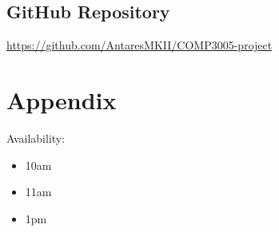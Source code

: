 \documentclass[fleqn]{scrreprt}
\begin{document}
\section{GitHub Repository}
\url{https://github.com/AntaresMKII/COMP3005-project}

\chapter{Appendix}
Availability:
\begin{itemize}
    \item 10am
    \item 11am
    \item 1pm
\end{itemize}
\end{document}
